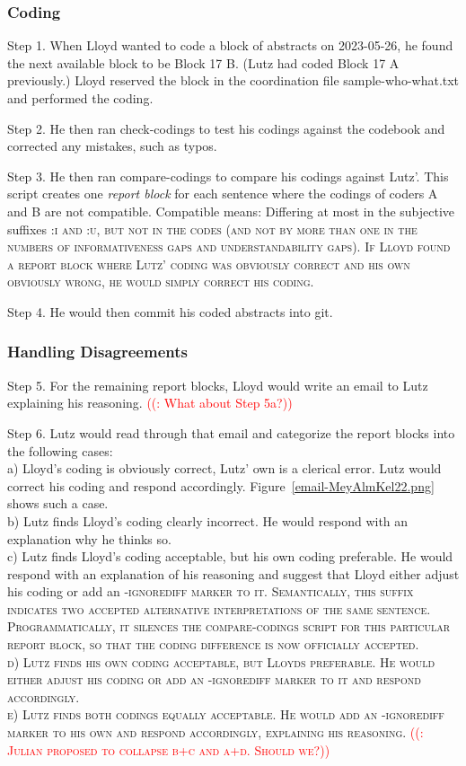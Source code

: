 \documentclass[10pt,journal,compsoc]{IEEEtran}
\newcommand{\Cb}[1]{\bgroup\scshape #1\egroup}  %
\newcommand{\Prg}[1]{\bgroup\ttfamily #1\egroup}  %
\newcounter{todonumber}
\newcommand{\Todo}[1]{\stepcounter{todonumber}\textcolor{red}{\sffamily ((\arabic{todonumber}: #1))}}
\begin{document}
\subsubsection{Coding}

\indent Step 1. When Lloyd wanted to code a block of abstracts on 2023-05-26,
he found the next available block to be Block 17 B.
(Lutz had coded Block 17 A previously.)
Lloyd reserved the block in the coordination file \Prg{sample-who-what.txt}
and performed the coding.

Step 2. He then ran \Prg{check-codings} to test his codings
against the codebook and corrected any mistakes, such as typos.

Step 3. He then ran \Prg{compare-codings} to compare his codings against Lutz'.
This script creates one \emph{report block} for each sentence where the codings
of coders A and B are not compatible.
Compatible means: Differing at most in the subjective suffixes \Cb{:i} and \Cb{:u}, but not in the codes
(and not by more than one in the numbers of informativeness gaps and understandability gaps).
If Lloyd found a report block where Lutz' coding was obviously correct and his own
obviously wrong, he would simply correct his coding.

Step 4. He would then commit his coded abstracts into git.


\subsubsection{Handling Disagreements}


\indent Step 5. For the remaining report blocks, Lloyd would write an email to Lutz explaining his reasoning.
\Todo{What about Step 5a?}

Step 6. Lutz would read through that email and categorize the report blocks into the following cases:\\
a) Lloyd's coding is obviously correct, Lutz' own is a clerical error.
Lutz would correct his coding and respond accordingly.
Figure~\ref{email-MeyAlmKel22.png} shows such a case.\\
b) Lutz finds Lloyd's coding clearly incorrect.
He would respond with an explanation why he thinks so.\\
c) Lutz finds Lloyd's coding acceptable, but his own coding preferable.
He would respond with an explanation of his reasoning and suggest that Lloyd
either adjust his coding or add an \Cb{-ignorediff} marker to it.
Semantically, this suffix indicates two accepted alternative interpretations of the same sentence.
Programmatically, it silences the \Prg{compare-codings} script for this particular report block,
so that the coding difference is now officially accepted.\\
d) Lutz finds his own coding acceptable, but Lloyds preferable.
He would either adjust his coding or add an \Cb{-ignorediff} marker to it
and respond accordingly.\\
e) Lutz finds both codings equally acceptable.
He would add an \Cb{-ignorediff} marker to his own
and respond accordingly, explaining his reasoning.
\Todo{Julian proposed to collapse b+c and a+d. Should we?}
\end{document}
